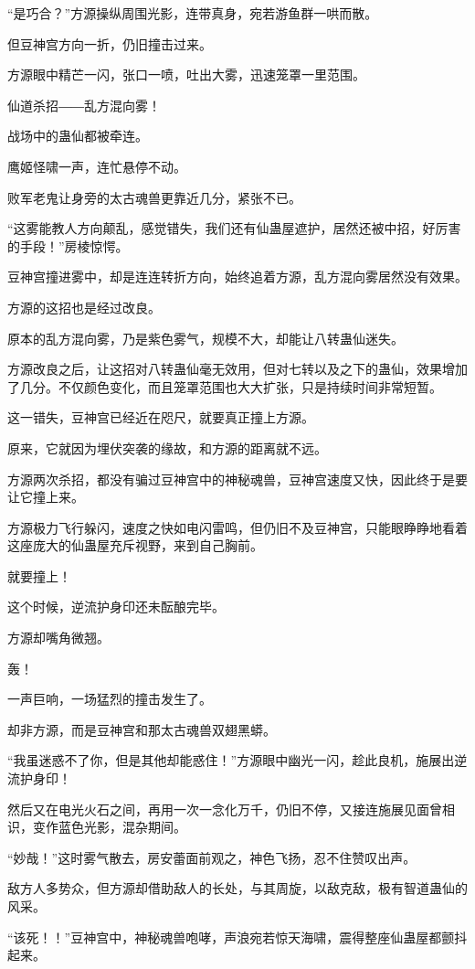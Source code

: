 \begin{this_body}
“是巧合？”方源操纵周围光影，连带真身，宛若游鱼群一哄而散。

但豆神宫方向一折，仍旧撞击过来。

方源眼中精芒一闪，张口一喷，吐出大雾，迅速笼罩一里范围。

仙道杀招――乱方混向雾！

战场中的蛊仙都被牵连。

鹰姬怪啸一声，连忙悬停不动。

败军老鬼让身旁的太古魂兽更靠近几分，紧张不已。

“这雾能教人方向颠乱，感觉错失，我们还有仙蛊屋遮护，居然还被中招，好厉害的手段！”房棱惊愕。

豆神宫撞进雾中，却是连连转折方向，始终追着方源，乱方混向雾居然没有效果。

方源的这招也是经过改良。

原本的乱方混向雾，乃是紫色雾气，规模不大，却能让八转蛊仙迷失。

方源改良之后，让这招对八转蛊仙毫无效用，但对七转以及之下的蛊仙，效果增加了几分。不仅颜色变化，而且笼罩范围也大大扩张，只是持续时间非常短暂。

这一错失，豆神宫已经近在咫尺，就要真正撞上方源。

原来，它就因为埋伏突袭的缘故，和方源的距离就不远。

方源两次杀招，都没有骗过豆神宫中的神秘魂兽，豆神宫速度又快，因此终于是要让它撞上来。

方源极力飞行躲闪，速度之快如电闪雷鸣，但仍旧不及豆神宫，只能眼睁睁地看着这座庞大的仙蛊屋充斥视野，来到自己胸前。

就要撞上！

这个时候，逆流护身印还未酝酿完毕。

方源却嘴角微翘。

轰！

一声巨响，一场猛烈的撞击发生了。

却非方源，而是豆神宫和那太古魂兽双翅黑蟒。

“我虽迷惑不了你，但是其他却能惑住！”方源眼中幽光一闪，趁此良机，施展出逆流护身印！

然后又在电光火石之间，再用一次一念化万千，仍旧不停，又接连施展见面曾相识，变作蓝色光影，混杂期间。

“妙哉！”这时雾气散去，房安蕾面前观之，神色飞扬，忍不住赞叹出声。

敌方人多势众，但方源却借助敌人的长处，与其周旋，以敌克敌，极有智道蛊仙的风采。

“该死！！”豆神宫中，神秘魂兽咆哮，声浪宛若惊天海啸，震得整座仙蛊屋都颤抖起来。


\end{this_body}
